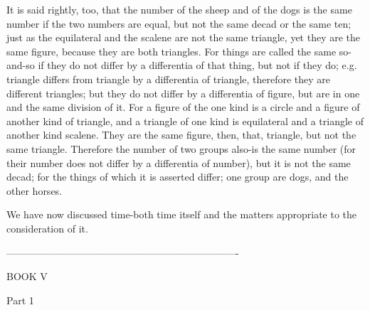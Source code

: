 It is said rightly, too, that the number of the sheep and of the dogs
is the same number if the two numbers are equal, but not the same
decad or the same ten; just as the equilateral and the scalene are
not the same triangle, yet they are the same figure, because they
are both triangles. For things are called the same so-and-so if they
do not differ by a differentia of that thing, but not if they do;
e.g. triangle differs from triangle by a differentia of triangle,
therefore they are different triangles; but they do not differ by
a differentia of figure, but are in one and the same division of it.
For a figure of the one kind is a circle and a figure of another kind
of triangle, and a triangle of one kind is equilateral and a triangle
of another kind scalene. They are the same figure, then, that, triangle,
but not the same triangle. Therefore the number of two groups also-is
the same number (for their number does not differ by a differentia
of number), but it is not the same decad; for the things of which
it is asserted differ; one group are dogs, and the other horses.

We have now discussed time-both time itself and the matters appropriate
to the consideration of it. 

----------------------------------------------------------------------

BOOK V

Part 1 


